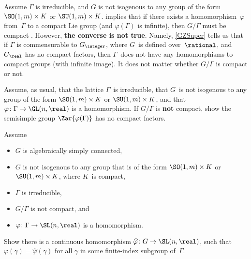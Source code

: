 \begin{warn}
Assume $\Gamma$ is irreducible, and $G$ is not isogenous to any group of the form $\SO(1,m) \times K$ or $\SU(1,m) \times K$.
 implies that if there exists a homomorphism~$\varphi$ from~$\Gamma$ to a compact Lie group (and $\varphi(\Gamma)$ is infinite), then $G/\Gamma$ must be compact . However, \textbf{the converse is not true}.  Namely, \cref{GZSuper} tells us that if $\Gamma$ is commensurable to $G_{\integer}$, where $G$~is defined over~$\rational$, and $G_{\real}$ has no compact factors, then $\Gamma$~does not have any homomorphisms to compact groups (with infinite image). It does not matter whether $G/\Gamma$ is compact or not.
\end{warn}

\begin{exercises}

\item \label{MargNoncpct}
Assume, as usual, that the lattice $\Gamma$~is irreducible, that $G$~is not isogenous to any group of the form $\SO(1,m) \times K$ or $\SU(1,m) \times K$, and that $\varphi \colon \Gamma \to \GL(n,\real)$ is a homomorphism. If $G/\Gamma$ is \textbf{not} compact, show the semisimple group $\Zar{\varphi(\Gamma)}$ has no compact factors.

\item \label{MargSuperNonCpctSCEx}
Assume
	\begin{itemize}
	\item $G$ is algebraically simply connected,
	\item $G$ is not isogenous to any group that is of the form\/ $\SO(1,m) \times K$ or\/ $\SU(1,m) \times K$, where $K$~is compact,
	\item $\Gamma$ is irreducible,
	\item $G/\Gamma$ is not compact,
	and
	\item $\varphi \colon \Gamma \to \SL(n,\real)$ is a homomorphism.
	\end{itemize}
Show there is a continuous homomorphism $\widehat\varphi \colon G \to \SL(n, \real)$, such that $\varphi(\gamma) = \widehat\varphi(\gamma)$ for all $\gamma$ in some finite-index subgroup of~$\Gamma$.



\end{exercises}
